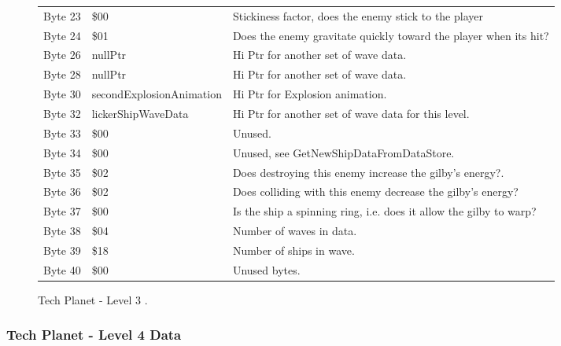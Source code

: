 \begin{figure}[H]
{\begin{adjustbox}{width=12cm}
\begin{tabular}{lll}
 Byte 23 & \$00                      & Stickiness factor, does the enemy stick to the player              \\
 Byte 24 & \$01                      & Does the enemy gravitate quickly toward the player when its hit?   \\
 Byte 26 & nullPtr                  & Hi Ptr for another set of wave data.                               \\
 Byte 28 & nullPtr                  & Hi Ptr for another set of wave data.                               \\
 Byte 30 & secondExplosionAnimation & Hi Ptr for Explosion animation.                                    \\
 Byte 32 & lickerShipWaveData       & Hi Ptr for another set of wave data for this level.                \\
 Byte 33 & \$00                      & Unused.                                                            \\
 Byte 34 & \$00                      & Unused, see GetNewShipDataFromDataStore.                           \\
 Byte 35 & \$02                      & Does destroying this enemy increase the gilby's energy?.           \\
 Byte 36 & \$02                      & Does colliding with this enemy decrease the gilby's energy?        \\
 Byte 37 & \$00                      & Is the ship a spinning ring, i.e. does it allow the gilby to warp? \\
 Byte 38 & \$04                      & Number of waves in data.                                           \\
 Byte 39 & \$18                      & Number of ships in wave.                                           \\
 Byte 40 & \$00                      & Unused bytes.                                                      \\
\bottomrule
\end{tabular}

  \end{adjustbox}

  }\caption*{Tech Planet - Level 3
.}
\end{figure}

\clearpage
\subsubsection{Tech Planet - Level 4 Data}


